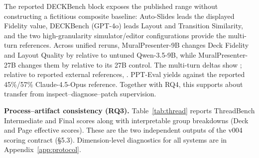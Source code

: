 The reported DECKBench block exposes the published range without constructing a fictitious composite baseline: Auto-Slides leads the displayed Fidelity value, DECKBench (GPT-4o) leads Layout and Transition Similarity, and the two high-granularity simulator/editor configurations provide the multi-turn references. Across unified reruns, MuralPresenter-9B changes Deck Fidelity and Layout Quality by  relative to untuned Qwen-3.5-9B, while MuralPresenter-27B changes them by  relative to its 27B control. The multi-turn deltas show ; relative to reported external references, . PPT-Eval yields  against the reported 45\%/57\% Claude-4.5-Opus reference. Together with RQ4, this supports  about transfer from inspect--diagnose--patch supervision.

\textbf{Process–artifact consistency (RQ3).} Table~\ref{tab:thread} reports ThreadBench Intermediate and Final scores along with interpretable group breakdowns (Deck and Page effective scores). These are the two independent outputs of the v004 scoring contract (§5.3). Dimension-level diagnostics for all systems are in Appendix~\ref{app:protocol}.

